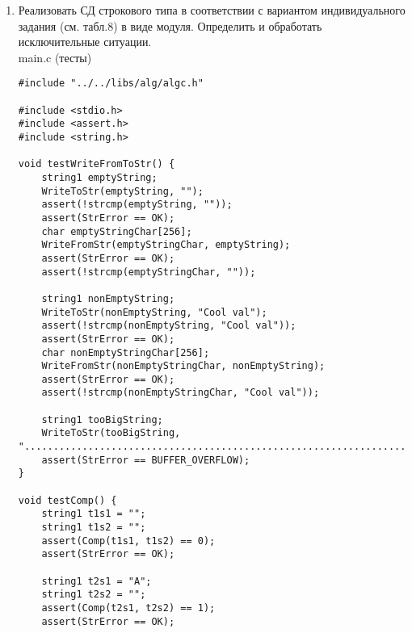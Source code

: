 \documentclass[a4paper,14pt]{extarticle}
\begin{document}
\begin{enumerate}
\begin{enumerate}[label*=\arabic*.]
		      \item Логический уровень представления СД.
		            \begin{enumerate}[label*=\arabic*.]
			            \item Способ описания СД и экземпляра СД на языке программирования.\\
						\begin{verbatim}
char string1[] = "Hello";
char string2[] = {'H', 'e', 'l', 'l', 'o', '\0'};
char *string3 = "world";
char string4[14];
												  \end{verbatim}
		            \end{enumerate}
	      \end{enumerate}
		  \item Реализовать СД строкового типа в соответствии с вариантом индивидуального
		  задания (см. табл.8) в виде модуля. Определить и обработать 
		  исключительные ситуации.\\
main.c (тесты)
		  \begin{verbatim}
#include "../../libs/alg/algc.h"

#include <stdio.h>
#include <assert.h>
#include <string.h>

void testWriteFromToStr() {
    string1 emptyString;
    WriteToStr(emptyString, "");
    assert(!strcmp(emptyString, ""));
    assert(StrError == OK);
    char emptyStringChar[256];
    WriteFromStr(emptyStringChar, emptyString);
    assert(StrError == OK);
    assert(!strcmp(emptyStringChar, ""));

    string1 nonEmptyString;
    WriteToStr(nonEmptyString, "Cool val");
    assert(!strcmp(nonEmptyString, "Cool val"));
    assert(StrError == OK);
    char nonEmptyStringChar[256];
    WriteFromStr(nonEmptyStringChar, nonEmptyString);
    assert(StrError == OK);
    assert(!strcmp(nonEmptyStringChar, "Cool val"));

    string1 tooBigString;
    WriteToStr(tooBigString, "....................................................................................................................................................................................................................................................................");
    assert(StrError == BUFFER_OVERFLOW);
}

void testComp() {
    string1 t1s1 = "";
    string1 t1s2 = "";
    assert(Comp(t1s1, t1s2) == 0);
    assert(StrError == OK);

    string1 t2s1 = "A";
    string1 t2s2 = "";
    assert(Comp(t2s1, t2s2) == 1);
    assert(StrError == OK);


\end{verbatim}
\end{enumerate}
\end{document}
